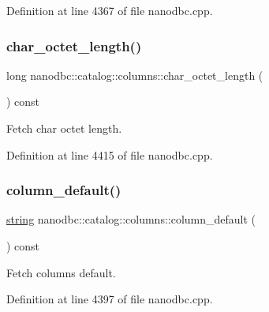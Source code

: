 Definition at line 4367 of file nanodbc.\+cpp.

\mbox{\label{classnanodbc_1_1catalog_1_1columns_ae68cdaf1be0289e1be1fcada433f0aaa}} 
\subsubsection{\texorpdfstring{char\_octet\_length()}{char\_octet\_length()}}
{\footnotesize\ttfamily long nanodbc\+::catalog\+::columns\+::char\+\_\+octet\+\_\+length (\begin{DoxyParamCaption}{ }\end{DoxyParamCaption}) const}



Fetch char octet length. 



Definition at line 4415 of file nanodbc.\+cpp.

\mbox{\label{classnanodbc_1_1catalog_1_1columns_a4b81f871ec4f0bdefe9ee0be831c94dc}} 
\subsubsection{\texorpdfstring{column\_default()}{column\_default()}}
{\footnotesize\ttfamily \mbox{\hyperlink{namespacenanodbc_abfc0ece56278e590911ec8352774c212}{string}} nanodbc\+::catalog\+::columns\+::column\+\_\+default (\begin{DoxyParamCaption}{ }\end{DoxyParamCaption}) const}



Fetch column\textquotesingle{}s default. 



Definition at line 4397 of file nanodbc.\+cpp.

\mbox{\label{classnanodbc_1_1catalog_1_1columns_a9cdc2dbee8dd4887a185649596fcce0a}} 
